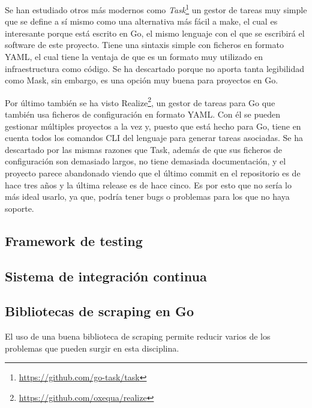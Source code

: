Se han estudiado otros más modernos como
\textit{Task}\footnote{\url{https://github.com/go-task/task}} un gestor de
tareas muy simple que se define a sí mismo como una alternativa más fácil a
make, el cual es interesante porque está escrito en Go, el mismo lenguaje con el
que se escribirá el software de este proyecto. Tiene una sintaxis simple con
ficheros en formato YAML, el cual tiene la ventaja de que es un formato muy
utilizado en infraestructura como código. Se ha descartado porque no aporta
tanta legibilidad como Mask, sin embargo, es una opción muy buena para proyectos
en Go.

Por último también se ha visto
Realize\footnote{\url{https://github.com/oxequa/realize}}, un gestor de tareas
para Go que también usa ficheros de configuración en formato YAML. Con él se
pueden gestionar múltiples proyectos a la vez y, puesto que está hecho para Go,
tiene en cuenta todos los comandos CLI del lenguaje para generar tareas
asociadas. Se ha descartado por las mismas razones que Task, además de que sus
ficheros de configuración son demasiado largos, no tiene demasiada
documentación, y el proyecto parece abandonado viendo que el último commit en el
repositorio es de hace tres años y la última release es de hace cinco. Es por
esto que no sería lo más ideal usarlo, ya que, podría tener bugs o problemas
para los que no haya soporte.

\subsection{Framework de testing}
\subsection{Sistema de integración continua}
\subsection{Bibliotecas de scraping en Go}
El uso de una buena biblioteca de scraping permite reducir varios de los
problemas que pueden surgir en esta disciplina.